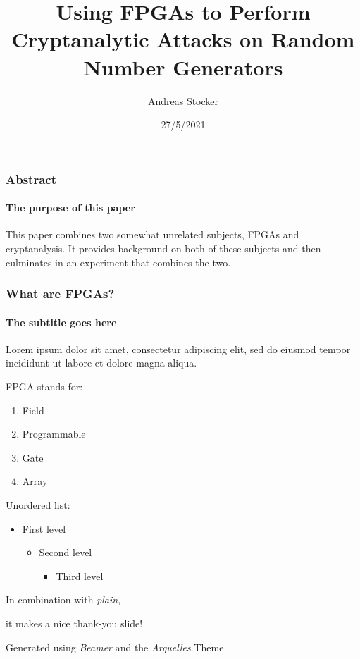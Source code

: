 \documentclass{beamer}
\title{Using FPGAs to Perform Cryptanalytic Attacks on Random Number Generators}
\subtitle{}
\date{27/5/2021}
\author{Andreas Stocker}
\institute{University of Nicosia\par\email{andreas@stockers.org}}
\begin{document}
  \frame[plain]{\titlepage}
  

  \begin{frame}
    \frametitle{Abstract}
    \framesubtitle{The purpose of this paper}

    This paper combines two somewhat unrelated subjects, FPGAs and cryptanalysis.
    It provides background on both of these subjects and then culminates
    in an experiment that combines the two.
  \end{frame}


  \begin{frame}
    \frametitle{What are FPGAs?}
    \framesubtitle{The subtitle goes here}
    Lorem ipsum dolor sit amet, consectetur adipiscing elit, sed do eiusmod tempor incididunt ut labore et dolore magna aliqua.\par
    \vfill
    FPGA stands for:
    \begin{enumerate}
      \item Field
      \item Programmable
      \item Gate
      \item Array
    \end{enumerate}
    \vfill
    Unordered list:
    \begin{itemize}
      \item First level
      \begin{itemize}
        \item Second level
        \begin{itemize}
          \item Third level
        \end{itemize}
      \end{itemize}
    \end{itemize}
  \end{frame}
   
  \ThankYou
  \begin{frame}
    In combination with \textit{plain},\par
    it makes a nice thank-you slide!

    \vfill{Generated using \textit{Beamer} and the \textit{Arguelles} Theme}
  \end{frame}
\end{document}
